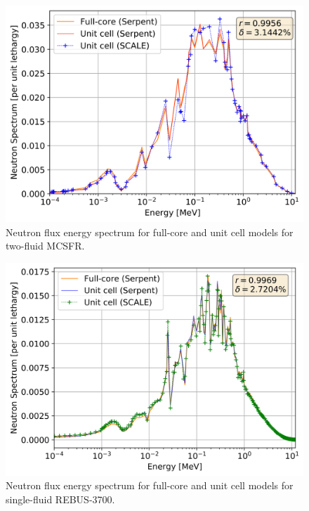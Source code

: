 \documentclass{anstrans}
\begin{document}
\begin{figure}[!htb]
  \centering
  \includegraphics[scale=0.585]{./Figures/mcsfr_full_vs_unit_spectrum.png}
  \caption{Neutron flux energy spectrum for full-core and unit cell models for two-fluid \gls{MCSFR}.}   
  \label{fig:spectrum_mcsfr}
\end{figure}
\begin{figure}[!htb]
  \centering
  \includegraphics[scale=0.58]{./Figures/rebus_full_vs_unit_spectrum.png}
  \caption{Neutron flux energy spectrum for full-core and unit cell models for single-fluid REBUS-3700.}   
  \label{fig:spectrum_rebus}
\end{figure}
\end{document}
